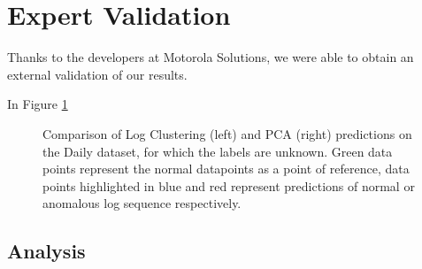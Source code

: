 \section{Expert Validation}

Thanks to the developers at Motorola Solutions, we were able to obtain an external validation of our results. 

In Figure \ref{fig:tsne-unlabeled-plots}
\begin{figure}%
    \centering
    \qquad
    \caption{Comparison of Log Clustering (left) and PCA (right) predictions on the Daily dataset, for which the labels are unknown. Green data points represent the normal datapoints as a point of reference, data points highlighted in blue and red represent predictions of normal or anomalous log sequence respectively.}%
    \label{fig:tsne-unlabeled-plots}%
\end{figure}

\subsection{Analysis}